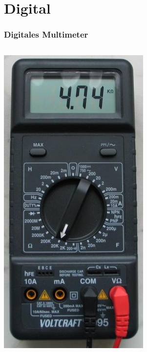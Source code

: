 \section*{Digital}

\begin{frame}
  \frametitle{Digitales Multimeter}
  \begin{columns}
    \begin{center}
      \includegraphics[width=\textwidth,height=.8\textheight,keepaspectratio]{a16/digitalmultimeter.jpg}\\

\end{center}
\end{columns}
\end{frame}
